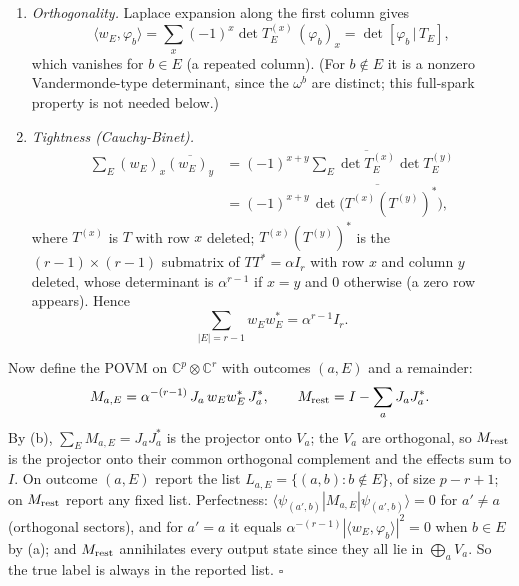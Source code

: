 \documentclass[
  11pt,
  a4paper,
]{article}
\begin{document}
\begin{enumerate}
\def\labelenumi{(\alph{enumi})}
\item
  \emph{Orthogonality.} Laplace expansion along the first column gives
  \[\langle w_E,\varphi_b\rangle=\sum_x(-1)^x\det T_E^{(x)}\,(\varphi_b)_x=\det[\varphi_b\,|\,T_E],\]
  which vanishes for \(b\in E\) (a repeated column). (For \(b\notin E\)
  it is a nonzero Vandermonde-type determinant, since the \(\omega^b\)
  are distinct; this full-spark property is not needed below.)
\item
  \emph{Tightness (Cauchy-Binet).} \[\begin{aligned}
  \sum_E(w_E)_x\overline{(w_E)_y}
  &=(-1)^{x+y}\sum_E\overline{\det T_E^{(x)}}\det T_E^{(y)}\\
  &=(-1)^{x+y}\,\overline{\det\big(T^{(x)}(T^{(y)})^*\big)},
  \end{aligned}\] where \(T^{(x)}\) is \(T\) with row \(x\) deleted;
  \(T^{(x)}(T^{(y)})^*\) is the \((r-1)\times(r-1)\) submatrix of
  \(TT^*=\alpha I_r\) with row \(x\) and column \(y\) deleted, whose
  determinant is \(\alpha^{r-1}\) if \(x=y\) and \(0\) otherwise (a zero
  row appears). Hence \[\sum_{|E|=r-1}w_Ew_E^*=\alpha^{r-1}I_r .\]
\end{enumerate}

Now define the POVM on \(\mathbb C^p\otimes\mathbb C^r\) with outcomes
\((a,\allowbreak{}E)\) and a remainder:
\[M_{a,E}=\alpha^{-(r-1)}\,J_a\,w_Ew_E^*\,J_a^*,\qquad M_{\rm rest}=I-\sum_aJ_aJ_a^*.\]
By (b), \(\sum_EM_{a,\allowbreak{}E}=J_aJ_a^*\) is the projector onto \(V_a\); the
\(V_a\) are orthogonal, so \(M_{\rm rest}\) is the projector onto their
common orthogonal complement and the effects sum to \(I\). On outcome
\((a,\allowbreak{}E)\) report the list \(L_{a,\allowbreak{}E}=\{(a,\allowbreak{}b):b\notin E\}\), of size
\(p-r+1\); on \(M_{\rm rest}\) report any fixed list. Perfectness:
\(\langle\psi_{(a',\allowbreak{}b)}|M_{a,\allowbreak{}E}|\psi_{(a',\allowbreak{}b)}\rangle=0\) for \(a'\ne a\)
(orthogonal sectors), and for \(a'=a\) it equals
\(\alpha^{-(r-1)}|\langle w_E,\allowbreak{}\varphi_b\rangle|^2=0\) when \(b\in E\) by
(a); and \(M_{\rm rest}\) annihilates every output state since they all
lie in \(\bigoplus_aV_a\). So the true label is always in the reported
list. \(\square\)
\end{document}
